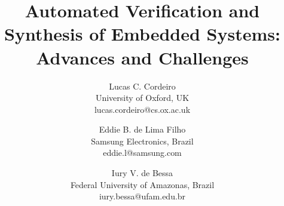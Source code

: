 \documentclass{acm_sen_article}
\begin{document}
%
\title{Automated Verification and Synthesis of Embedded Systems: Advances and Challenges}


\author{Lucas C. Cordeiro \\
University of Oxford, UK\\
lucas.cordeiro@cs.ox.ac.uk
\and
Eddie B. de Lima Filho \\
Samsung Electronics, Brazil \\
eddie.l@samsung.com
\and
Iury V. de Bessa \\
Federal University of Amazonas, Brazil \\
iury.bessa@ufam.edu.br}


% 
\end{document}
